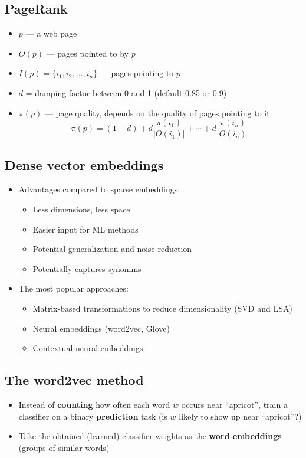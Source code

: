 \documentclass{article}
\begin{document}
    \subsection{PageRank}
    \begin{itemize}
        \item $p$ --- a web page
        \item $O(p)$ --- pages pointed to by $p$
        \item $I(p) = \{i_1, i_2, \ldots, i_n\}$ --- pages pointing to $p$
        \item $d$ = damping factor between 0 and 1 (default 0.85 or 0.9)
        \item $\pi(p)$ --- page quality, depends on the quality of pages pointing to it
        \[ \pi(p) = (1 - d) + d \frac{\pi(i_1)}{|O(i_1)|} + \cdots + d \frac{\pi(i_n)}{|O(i_n)|} \]
    \end{itemize}

    \subsection{Dense vector embeddings}
    \begin{itemize}
        \item Advantages compared to sparse embeddings:
        \begin{itemize}
            \item Less dimensions, less space
            \item Easier input for ML methods
            \item Potential generalization and noise reduction
            \item Potentially captures synonims
        \end{itemize}
        \item The most popular approaches:
        \begin{itemize}
            \item Matrix-based transformations to reduce dimensionality (SVD and LSA)
            \item Neural embeddings (word2vec, Glove)
            \item Contextual neural embeddings
        \end{itemize}
    \end{itemize}

    \subsection{The word2vec method}
    \begin{itemize}
        \item Instead of \textbf{counting} how often each word $w$ occurs near ``apricot'', train a classifier on a binary \textbf{prediction} task (is $w$ likely to show up near ``apricot''?)
        \item Take the obtained (learned) classifier weights as the \textbf{word embeddings} (groups of similar words)
    \end{itemize}
\end{document}
